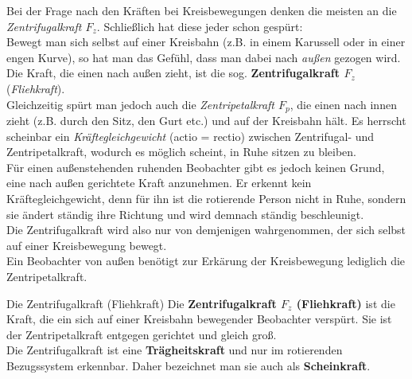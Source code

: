 \documentclass{beamer}
\begin{document}
{Bei der Frage nach den Kräften bei Kreisbewegungen denken die meisten an die \textit{Zentrifugalkraft $F_z$}. Schließlich hat diese jeder schon gespürt:\\
Bewegt man sich selbst auf einer Kreisbahn (z.B. in einem Karussell oder in einer engen Kurve), so hat man das Gefühl, dass man dabei nach \textit{außen} gezogen wird. Die Kraft, die einen nach außen zieht, ist die sog. \textbf{Zentrifugalkraft $F_z$} (\textit{Fliehkraft}).\\
Gleichzeitig spürt man jedoch auch die \textit{Zentripetalkraft $F_p$}, die einen nach innen zieht (z.B. durch den Sitz, den Gurt etc.) und auf der Kreisbahn hält. Es herrscht scheinbar ein \textit{Kräftegleichgewicht} (actio = rectio) zwischen Zentrifugal- und Zentripetalkraft, wodurch es möglich scheint, in Ruhe sitzen zu bleiben.\\
Für einen außenstehenden ruhenden Beobachter gibt es jedoch keinen Grund, eine nach außen gerichtete Kraft anzunehmen. Er erkennt kein Kräftegleichgewicht, denn für ihn ist die rotierende Person nicht in Ruhe, sondern sie ändert ständig ihre Richtung und wird demnach ständig beschleunigt.\\
Die Zentrifugalkraft wird also nur von demjenigen wahrgenommen, der sich selbst auf einer Kreisbewegung bewegt.\\
Ein Beobachter von außen benötigt zur Erkärung der Kreisbewegung lediglich die Zentripetalkraft.
   \begin{block}{Die Zentrifugalkraft (Fliehkraft)}
   Die \textbf{Zentrifugalkraft $F_z$ (Fliehkraft)} ist die Kraft, die ein sich auf einer Kreisbahn bewegender Beobachter verspürt. Sie ist der Zentripetalkraft entgegen gerichtet und gleich groß.\\
   Die Zentrifugalkraft ist eine \textbf{Trägheitskraft} und nur im rotierenden Bezugssystem erkennbar. Daher bezeichnet man sie auch als \textbf{Scheinkraft}.
   \end{block}
}
\end{document}
